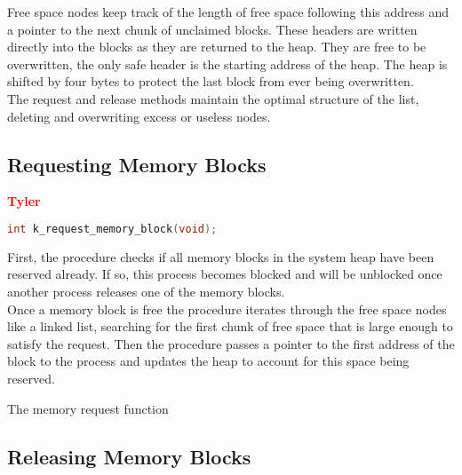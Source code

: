 \documentclass[12pt]{report}
\begin{document}
Free space nodes keep track of the length of free space following this address and a pointer to the next chunk of unclaimed blocks. These headers are written directly into the blocks as they are returned to the heap. They are free to be overwritten, the only safe header is the starting address of the heap. The heap is shifted by four bytes to protect the last block from ever being overwritten. \\

The request and release methods maintain the optimal structure of the list, deleting and overwriting excess or useless nodes.\\


\subsection{Requesting Memory Blocks}

\textcolor{red}{\textbf{Tyler}} \\
\begin{minipage}{\textwidth}
\begin{lstlisting}[language=C, frame=single]
int k_request_memory_block(void);
\end{lstlisting}
\end{minipage}

First, the procedure checks if all memory blocks in the system heap have been reserved already. If so, this process becomes blocked and will be unblocked once another process releases one of the memory blocks. \\
Once a memory block is free the procedure iterates through the free space nodes like a linked list, searching for the first chunk of free space that is large enough to satisfy the request. Then the procedure passes a pointer to the first address of the block to the process and updates the heap to account for this space being reserved. \\

\begin{algorithm}
  \caption{The memory request function}
  \begin{algorithmic}[1]
	  \EndWhile
    \EndProcedure
  \end{algorithmic}
\end{algorithm}

\subsection{Releasing Memory Blocks}
\end{document}

